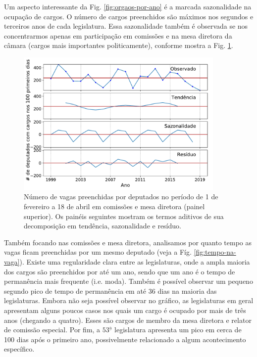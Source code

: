 \documentclass[12pt,a4paper]{article}
\begin{document}
Um aspecto interessante da Fig. \ref{fig:orgaos-por-ano} é a marcada sazonalidade na ocupação de cargos.
O número de cargos preenchidos são máximos nos segundos e terceiros anos de cada legislatura. Essa sazonalidade
também é observada se nos concentrarmos apenas em participação em comissões e na mesa diretora da câmara
(cargos mais importantes politicamente), conforme mostra a Fig. \ref{fig:cargos-por-ano}.

\begin{figure}[H]
\centering
\includegraphics[width=0.9\textwidth]{graficos/cargos_sazonalidade_2019-05-06.pdf}
\caption{Número de vagas preenchidas por deputados no período de 1 de fevereiro a 18
  de abril em comissões e mesa diretora (painel superior). Os painéis seguintes mostram os termos aditivos
  de sua decomposição em tendência, sazonalidade e resíduo.}
\label{fig:cargos-por-ano}
\end{figure} 

Também focando nas comissões e mesa diretora, analisamos por quanto tempo as vagas ficam preenchidas por um mesmo
deputado (veja a Fíg. \ref{fig:tempo-na-vaga}). Existe uma regularidade clara entre as legislaturas, onde a ampla
maioria dos cargos são preenchidos por até um ano, sendo que um ano é o tempo de permanência mais frequente
(i.e. moda). Também é possível observar um pequeno segundo pico de tempo de permanência em até 36 dias na maioria
das legislaturas. Embora não seja possível observar no gráfico, as legislaturas em geral apresentam alguns poucos
casos nos quais um cargo é ocupado por mais de três anos (chegando a quatro). Esses são cargos de membro da mesa
diretora e relator de comissão especial. Por fim, a $53^{\mathrm{\underline{a}}}$ legislatura apresenta um pico em cerca
de 100 dias após o primeiro ano, possivelmente relacionado a algum acontecimento específico.
\end{document}
